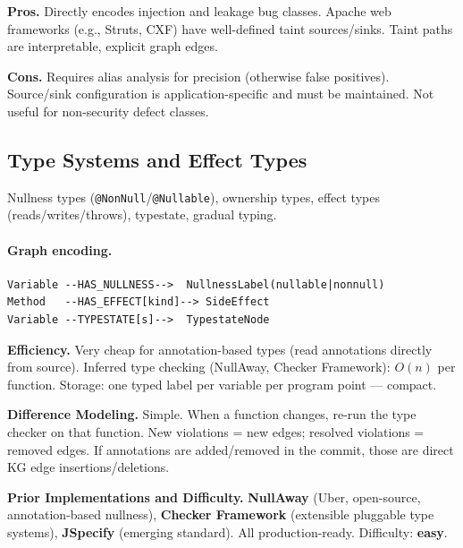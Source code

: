 \documentclass[12pt,a4paper]{article}
\begin{document}
\begin{prosbox}
\textbf{Pros.}
Directly encodes injection and leakage bug classes. Apache web frameworks
(e.g., Struts, CXF) have well-defined taint sources/sinks. Taint paths
are interpretable, explicit graph edges.
\end{prosbox}

\begin{consbox}
\textbf{Cons.}
Requires alias analysis for precision (otherwise false positives). Source/sink
configuration is application-specific and must be maintained. Not useful for
non-security defect classes.
\end{consbox}

\subsection{Type Systems and Effect Types}

Nullness types (\texttt{@NonNull}/\texttt{@Nullable}), ownership types,
effect types (reads/writes/throws), typestate, gradual typing.

\paragraph{Graph encoding.}
\begin{lstlisting}
Variable --HAS_NULLNESS-->  NullnessLabel(nullable|nonnull)
Method   --HAS_EFFECT[kind]--> SideEffect
Variable --TYPESTATE[s]-->  TypestateNode
\end{lstlisting}

\begin{effbox}
\textbf{Efficiency.}
Very cheap for annotation-based types (read annotations directly from source).
Inferred type checking (NullAway, Checker Framework): $O(n)$ per function.
Storage: one typed label per variable per program point --- compact.
\end{effbox}

\begin{diffbox}
\textbf{Difference Modeling.}
Simple. When a function changes, re-run the type checker on that function.
New violations = new edges; resolved violations = removed edges. If annotations
are added/removed in the commit, those are direct KG edge insertions/deletions.
\end{diffbox}

\begin{implbox}
\textbf{Prior Implementations and Difficulty.}
\textbf{NullAway} (Uber, open-source, annotation-based nullness), \textbf{Checker
Framework} (extensible pluggable type systems), \textbf{JSpecify} (emerging
standard). All production-ready. Difficulty: \textbf{easy}.
\end{implbox}
\end{document}
